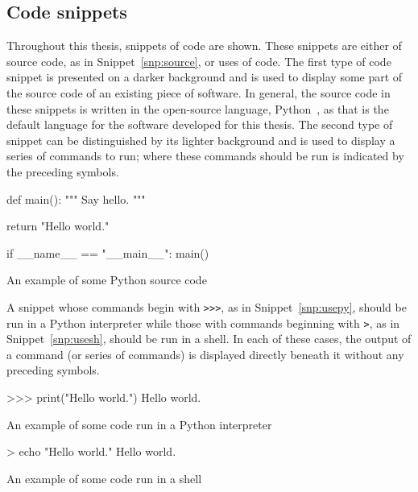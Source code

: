 \subsection{Code snippets}

Throughout this thesis, snippets of code are shown. These snippets are either of
source code, as in Snippet~\ref{snp:source}, or uses of code. The first type of
code snippet is presented on a darker background and is used to display some
part of the source code of an existing piece of software. In general, the source
code in these snippets is written in the open-source language,
Python~\cite{python}, as that is the default language for the software developed
for this thesis. The second type of snippet can be distinguished by its lighter
background and is used to display a series of commands to run; where these
commands should be run is indicated by the preceding symbols.

\begin{listing}[htbp]
\begin{sourcepy}
def main():
    """ Say hello. """

    return "Hello world."

if __name__ == "__main__":
    main()
\end{sourcepy}
\caption{An example of some Python source code}\label{snp:source}
\end{listing}

A snippet whose commands begin with \texttt{>>>}, as in
Snippet~\ref{snp:usepy}, should be run in a Python interpreter while those with
commands beginning with \texttt{>}, as in Snippet~\ref{snp:usesh},
should be run in a shell. In each of these cases, the output of a command (or
series of commands) is displayed directly beneath it without any preceding
symbols.

\begin{listing}[htbp]
\begin{usagepy}
>>> print("Hello world.")
Hello world.

\end{usagepy}
\caption{An example of some code run in a Python interpreter}\label{snp:usepy}
\end{listing}

\begin{listing}[htbp]
\begin{usagesh}
> echo "Hello world."
Hello world.
\end{usagesh}
\caption{An example of some code run in a shell}\label{snp:usesh}
\end{listing}

